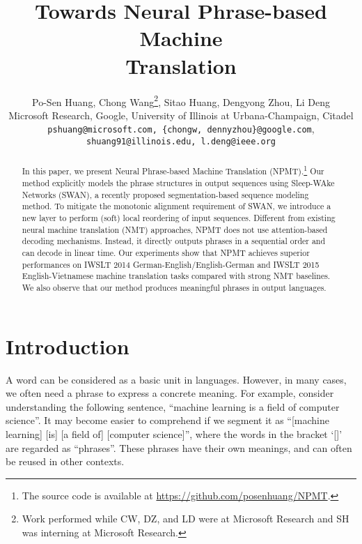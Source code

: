 \documentclass{article}
\title{Towards Neural Phrase-based Machine \\ Translation}
\author{Po-Sen Huang, Chong Wang\thanks{Work performed while CW, DZ, and LD were at Microsoft Research and SH was interning at Microsoft Research.}, Sitao Huang\footnotemark[1], Dengyong Zhou\footnotemark[1], Li Deng\footnotemark[1] \\
	Microsoft Research, Google, University of Illinois at Urbana-Champaign, Citadel\\
	{\small\texttt{pshuang@microsoft.com, \{chongw, dennyzhou\}@google.com},}\\ {\small\texttt{shuang91@illinois.edu, l.deng@ieee.org}}
	\\
}
\begin{document}
 
\maketitle






















\begin{abstract} 
  In this paper, we present Neural Phrase-based Machine Translation (NPMT).\footnote{The source code is available at \url{https://github.com/posenhuang/NPMT}.} Our
  method explicitly models the phrase structures in output sequences using
  Sleep-WAke Networks (SWAN), a recently proposed segmentation-based sequence
  modeling method. To mitigate the monotonic alignment requirement of SWAN, we
  introduce a new layer to perform (soft) local reordering of input sequences.
  Different from existing neural machine translation (NMT) approaches, NPMT does
  not use attention-based decoding mechanisms. 
  Instead, it directly outputs phrases in a sequential order and can decode in linear time. 
  Our experiments show that NPMT achieves superior performances on IWSLT 2014 German-English/English-German and IWSLT
  2015 English-Vietnamese machine translation tasks compared with strong NMT baselines.
  We also observe that our method produces meaningful phrases in output
  languages.
\end{abstract} 

\section{Introduction}
\label{sec:intro}

A word can be considered as a basic unit in languages. However, in many cases, we
often need a phrase to express a concrete meaning.
For example, consider understanding the following sentence, 
``machine learning is a field of computer science''. It may become easier to comprehend if we segment it
as ``[machine learning] [is] [a field of] [computer science]'', where the
words in the bracket `[]' are regarded as ``phrases''.
These phrases have their own meanings,  and can often be reused in other contexts. 
\end{document}
